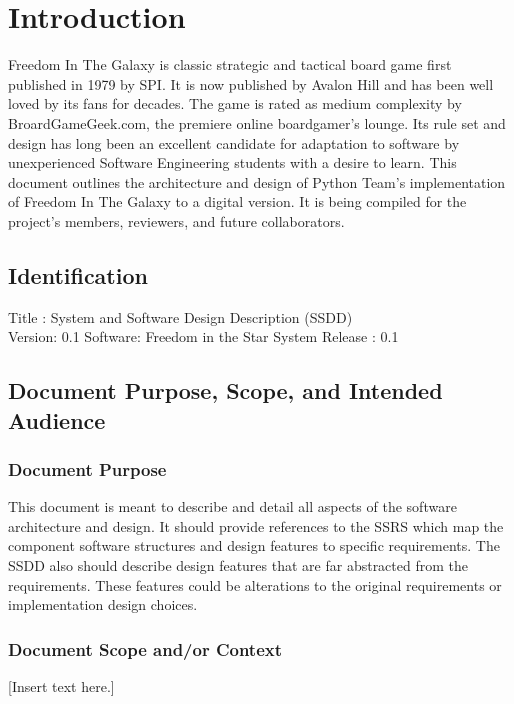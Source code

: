 \documentclass[twoside,letterpaper]{article}
\begin{document}
\setcounter{tocdepth}{9}
\renewcommand\contentsname{\centering\textsc{\textbf{Table of Contents}}}
\tableofcontents

\section{Introduction}
Freedom In The Galaxy is classic strategic and tactical board game first published in 1979 by SPI. It is now published by Avalon Hill and has been well loved by its fans for decades. The game is rated as medium complexity by BroardGameGeek.com, the premiere online boardgamer's lounge. Its rule set and design has long been an excellent candidate for adaptation to software by unexperienced Software Engineering students with a desire to learn. This document outlines the architecture and design of Python Team's implementation of Freedom In The Galaxy to a digital version. It is being compiled for the project's members, reviewers, and future collaborators.

\subsection{Identification}
Title : System and Software Design Description (SSDD)\\
Version: 0.1
Software: Freedom in the Star System
Release : 0.1

\subsection{Document Purpose, Scope, and Intended Audience}

\subsubsection{Document Purpose}
This document is meant to describe and detail all aspects of the software architecture and design. It should provide references to the SSRS which map the component software structures and design features to specific requirements. The SSDD also should describe design features that are far abstracted from the requirements. These features could be alterations to the original requirements or implementation design choices.

\subsubsection{Document Scope and/or Context}
[Insert text here.]
\end{document}
